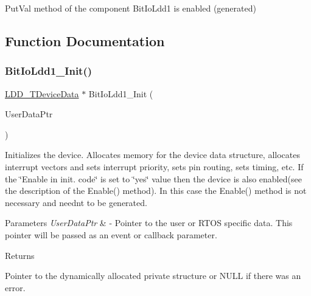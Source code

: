 Put\+Val method of the component Bit\+Io\+Ldd1 is enabled (generated) 

\subsection{Function Documentation}
\mbox{\label{group___bit_io_ldd1__module_gadb85449174dc263f061e143166eb86c5}} 
\subsubsection{\texorpdfstring{Bit\+Io\+Ldd1\+\_\+\+Init()}{BitIoLdd1\_Init()}}
{\footnotesize\ttfamily \hyperlink{group___p_e___types__module_gac5cf1362f1f0e3a2ce71b1bf2276d091}{L\+D\+D\+\_\+\+T\+Device\+Data} $\ast$ Bit\+Io\+Ldd1\+\_\+\+Init (\begin{DoxyParamCaption}\item[{\hyperlink{group___p_e___types__module_ga0b66a73f87238a782318aa0be7578e35}{L\+D\+D\+\_\+\+T\+User\+Data} $\ast$}]{User\+Data\+Ptr }\end{DoxyParamCaption})}



Initializes the device. Allocates memory for the device data structure, allocates interrupt vectors and sets interrupt priority, sets pin routing, sets timing, etc. If the \char`\"{}\+Enable
    in init. code\char`\"{} is set to \char`\"{}yes\char`\"{} value then the device is also enabled(see the description of the Enable() method). In this case the Enable() method is not necessary and needn\textquotesingle{}t to be generated. 


\begin{DoxyParams}{Parameters}
{\em User\+Data\+Ptr} & -\/ Pointer to the user or R\+T\+OS specific data. This pointer will be passed as an event or callback parameter. \\
\hline
\end{DoxyParams}
\begin{DoxyReturn}{Returns}

\begin{DoxyItemize}
\item Pointer to the dynamically allocated private structure or N\+U\+LL if there was an error. 
\end{DoxyItemize}
\end{DoxyReturn}
\mbox{\label{group___bit_io_ldd1__module_ga753b1b610d7f46784d5e5ec7ca43d6cd}} 
